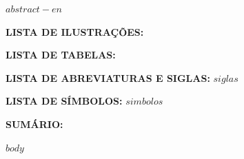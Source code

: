 \documentclass[
  12pt,
  oneside,
  a4paper,
  chapter=TITLE,
  english,portuguese
]{abntex2}
\begin{document}
\vspace{\onelineskip}
$abstract-en$
\newpage

\noindent\textbf{LISTA DE ILUSTRAÇÕES:}

\vspace{\onelineskip}
\listoffigures
\newpage

\noindent\textbf{LISTA DE TABELAS:}

\vspace{\onelineskip}
\listoftables
\newpage

\noindent\textbf{LISTA DE ABREVIATURAS E SIGLAS:}
\vspace{\onelineskip}
$siglas$
\newpage

\noindent\textbf{LISTA DE SÍMBOLOS:}
\vspace{\onelineskip}
$simbolos$
\newpage

\noindent\textbf{SUMÁRIO:}
\vspace{\onelineskip}
\begingroup
\renewcommand{\contentsname}{}
\tableofcontents
\endgroup
\newpage

\mainmatter
$body$



\end{document}
